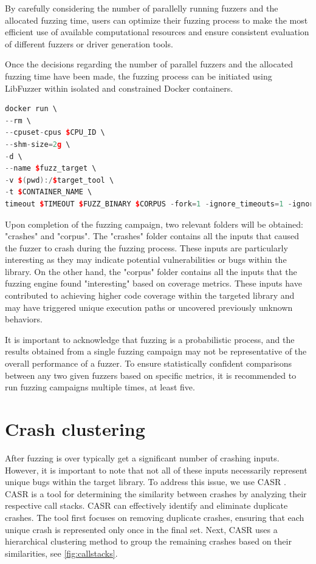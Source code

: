\documentclass[a4paper,11pt,oneside]{report}
\begin{document}
By carefully considering the number of parallelly running fuzzers 
and the allocated fuzzing time, users can optimize their fuzzing 
process to make the most efficient use of available computational
resources and ensure consistent evaluation of different fuzzers or
driver generation tools. 

Once the decisions regarding the number of parallel fuzzers and 
the allocated fuzzing time have been made, the fuzzing process 
can be initiated using LibFuzzer within isolated and constrained
Docker containers.

\begin{lstlisting}[language={c++}]
docker run \
--rm \
--cpuset-cpus $CPU_ID \
--shm-size=2g \
-d \
--name $fuzz_target \
-v $(pwd):/$target_tool \
-t $CONTAINER_NAME \
timeout $TIMEOUT $FUZZ_BINARY $CORPUS -fork=1 -ignore_timeouts=1 -ignore_crashes=1 -ignore_ooms=1 -artifact_prefix=$CRASHES
\end{lstlisting}


Upon completion of the fuzzing campaign, two relevant folders will
be obtained: "crashes" and "corpus". The "crashes" folder contains 
all the inputs that caused the fuzzer to crash during the fuzzing 
process. These inputs are particularly interesting as they may 
indicate potential vulnerabilities or bugs within the library.
On the other hand, the "corpus" folder contains all the inputs 
that the fuzzing engine found "interesting" based on coverage 
metrics. These inputs have contributed to achieving higher code 
coverage within the targeted library and may have triggered unique 
execution paths or uncovered previously unknown behaviors.

It is important to acknowledge that fuzzing is a probabilistic 
process, and the results obtained from a single fuzzing campaign
may not be representative of the overall performance of a fuzzer. 
To ensure statistically confident comparisons between any two 
given fuzzers based on specific metrics, it is recommended to run 
fuzzing campaigns multiple times, at least five.

\section{Crash clustering}
After fuzzing is over typically get a significant number of crashing inputs.
However, it is important to note that not all of these inputs necessarily
represent unique bugs within the target library. To address this issue, we 
use CASR \cite{casr}. CASR is a tool for determining the similarity 
between crashes by analyzing their respective call stacks. CASR can
effectively identify and eliminate duplicate crashes. The tool first 
focuses on removing duplicate crashes, ensuring that each unique crash is 
represented only once in the final set. Next, CASR uses a hierarchical 
clustering method to group the remaining crashes based on their
similarities, see \autoref{fig:callstacks}. 
\end{document}
